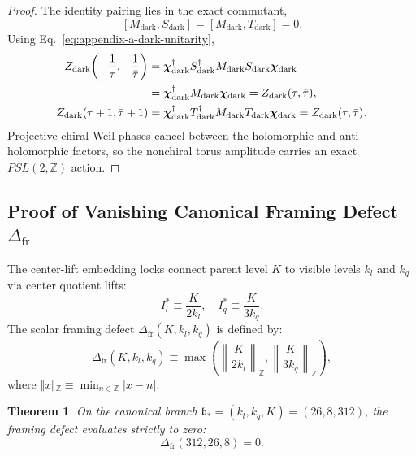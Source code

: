\documentclass[11pt,letterpaper]{article}
\theoremstyle{plain}
\newtheorem{theorem}{Theorem}
\begin{document}
\begin{proof}
The identity pairing lies in the exact commutant,
\begin{equation}
\label{eq:appendix-a-dark-exact-commutant}
 [M_{\text{dark}},S_{\text{dark}}]
 =
 [M_{\text{dark}},T_{\text{dark}}]
 =
 0.
\end{equation}
Using Eq.~\eqref{eq:appendix-a-dark-unitarity},
\begin{align}
\label{eq:appendix-a-dark-torus-s-proof}
 Z_{\text{dark}}\!\left(-\frac{1}{\tau},-\frac{1}{\bar\tau}\right)
 &=
 \boldsymbol\chi_{\text{dark}}^\dagger
 S_{\text{dark}}^\dagger
 M_{\text{dark}}
 S_{\text{dark}}
 \boldsymbol\chi_{\text{dark}}
 \notag\\
 &=
 \boldsymbol\chi_{\text{dark}}^\dagger
 M_{\text{dark}}
 \boldsymbol\chi_{\text{dark}}
 =
 Z_{\text{dark}}(\tau,\bar\tau),
 \\
\label{eq:appendix-a-dark-torus-t-proof}
 Z_{\text{dark}}(\tau+1,\bar\tau+1)
 &=
 \boldsymbol\chi_{\text{dark}}^\dagger
 T_{\text{dark}}^\dagger
 M_{\text{dark}}
 T_{\text{dark}}
 \boldsymbol\chi_{\text{dark}}
 =
 Z_{\text{dark}}(\tau,\bar\tau).
\end{align}
Projective chiral Weil phases cancel between the holomorphic and
anti-holomorphic factors, so the nonchiral torus amplitude carries an exact
$PSL(2,\mathbb Z)$ action.
\end{proof}

\subsection{Proof of Vanishing Canonical Framing Defect \texorpdfstring{$\Delta_{\text{fr}}$}{Delta-fr}}
The center-lift embedding locks connect parent level $K$ to visible levels $k_l$ and $k_q$ via center quotient lifts:
\begin{equation}
I_l^* \equiv \frac{K}{2 k_l}, \quad I_q^* \equiv \frac{K}{3 k_q}.
\end{equation}
The scalar framing defect $\Delta_{\text{fr}}(K, k_l, k_q)$ is defined by:
\begin{equation}
\Delta_{\text{fr}}(K, k_l, k_q) \equiv \max\left( \left\| \frac{K}{2 k_l} \right\|_{\mathbb{Z}}, \left\| \frac{K}{3 k_q} \right\|_{\mathbb{Z}} \right),
\end{equation}
where $\Vert{} x \Vert{}_{\mathbb{Z}} \equiv \min_{n \in \mathbb{Z}} \vert{}x - n\vert{}$.

\begin{theorem}
On the canonical branch $\mathfrak{b}_* = (k_l, k_q, K) = (26, 8, 312)$, the framing defect evaluates strictly to zero:
\begin{equation}
\Delta_{\text{fr}}(312, 26, 8) = 0.
\end{equation}
\end{theorem}
\end{document}
